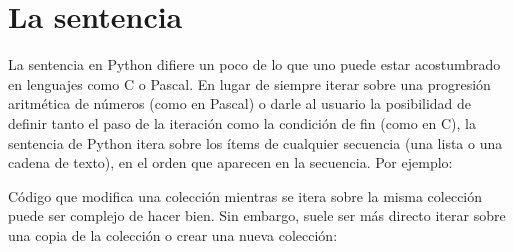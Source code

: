 \documentclass[a5paper,10pt,spanish]{sphinxmanual}
\begin{document}
\section{La sentencia }
\label{\detokenize{tutorial/controlflow:for-statements}}\label{\detokenize{tutorial/controlflow:tut-for}}
\ignorespaces 
\sphinxAtStartPar
La sentencia  en Python difiere un poco de lo que uno puede estar acostumbrado en lenguajes como C o Pascal. En lugar de siempre iterar sobre una progresión aritmética de números (como en Pascal) o darle al usuario la posibilidad de definir tanto el paso de la iteración como la condición de fin (como en C), la sentencia  de Python itera sobre los ítems de cualquier secuencia (una lista o una cadena de texto), en el orden que aparecen en la secuencia. Por ejemplo:

\begin{sphinxVerbatim}[commandchars=\\\{\}]
  \PYG{p}{[}  \PYG{p}{]}
   
     
\end{sphinxVerbatim}

\sphinxAtStartPar
Código que modifica una colección mientras se itera sobre la misma colección puede ser complejo de hacer bien. Sin embargo, suele ser más directo iterar sobre una copia de la colección o crear una nueva colección:
\end{document}
